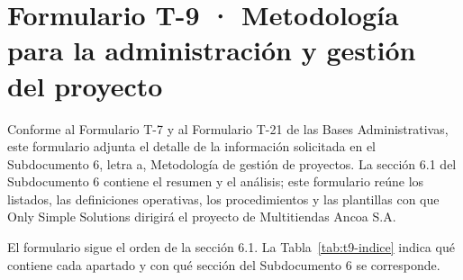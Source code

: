 \documentclass[11pt]{article}
\begin{document}
\tableofcontents
\clearpage

\renewcommand{\tablename}{Tabla}
\renewcommand{\thetable}{T-9.\arabic{table}}

\section{Formulario T-9 · Metodología para la administración y gestión del proyecto}\label{formulario-t-9}

Conforme al Formulario T-7 y al Formulario T-21 de las Bases Administrativas, este formulario adjunta el detalle de la información solicitada en el Subdocumento 6, letra a, Metodología de gestión de proyectos. La sección 6.1 del Subdocumento 6 contiene el resumen y el análisis; este formulario reúne los listados, las definiciones operativas, los procedimientos y las plantillas con que Only Simple Solutions dirigirá el proyecto de Multitiendas Ancoa S.A.

El formulario sigue el orden de la sección 6.1. La Tabla~\mbox{\ref{tab:t9-indice}} indica qué contiene cada apartado y con qué sección del Subdocumento 6 se corresponde.
\end{document}
